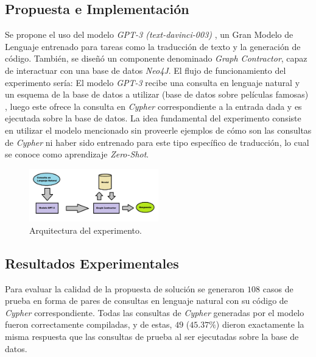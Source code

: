 \documentclass[a4paper,10pt,twocolumn]{article}
\begin{document}
\subsection{Propuesta e Implementación \cite{repo}}
Se propone el uso del modelo \textit{GPT-3 (text-davinci-003)} \cite{gpt3}, un Gran Modelo de Lenguaje entrenado para tareas como la traducción de texto y la generación de código. También, se diseñó un componente denominado \textit{Graph Contractor}, capaz de interactuar con una base de datos \textit{Neo4J}. El flujo de funcionamiento del experimento sería: El modelo \textit{GPT-3} recibe una consulta en lenguaje natural y un esquema \cite{dbschema} de la base de datos a utilizar (base de datos sobre películas famosas) \cite{moviesdb}, luego este ofrece la consulta en \textit{Cypher} correspondiente a la entrada dada y es ejecutada sobre la base de datos. La idea fundamental del experimento consiste en utilizar el modelo mencionado sin proveerle ejemplos de cómo son las consultas de \textit{Cypher} ni haber sido entrenado para este tipo específico de traducción, lo cual se conoce como aprendizaje \textit{Zero-Shot}.

\begin{figure}[h!]
\includegraphics[width=0.5\textwidth]{../img/architecture.png}
\caption{Arquitectura del experimento.}\label{img:arch}
\end{figure}

\subsection{Resultados Experimentales}
Para evaluar la calidad de la propuesta de solución se generaron $108$ casos de prueba en forma de pares de consultas en lenguaje natural con su código de \textit{Cypher} correspondiente. Todas las consultas de \textit{Cypher} generadas por el modelo fueron correctamente compiladas, y  de estas, $49$ ($45.37\%$) dieron exactamente la misma respuesta que las consultas de prueba al ser ejecutadas sobre la base de datos.
\end{document}
